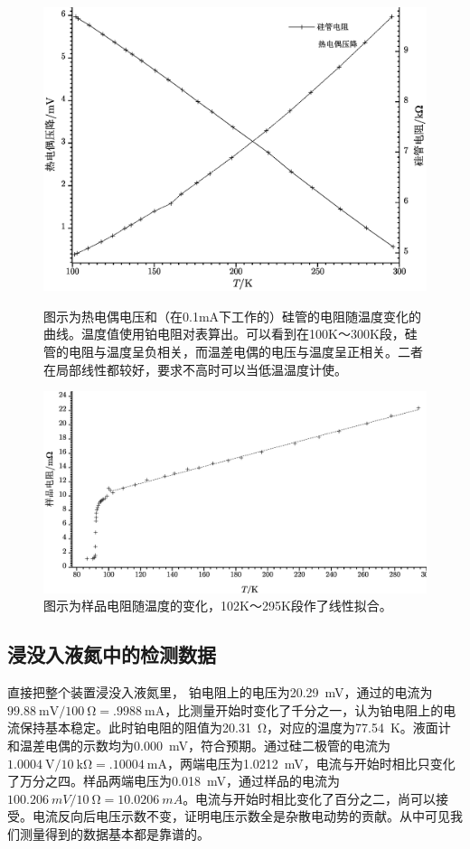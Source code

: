 \documentclass[UTF8]{ctexart}
\begin{document}
\begin{figure}
  \centering
  \includegraphics[width=0.8\linewidth]{wdj.eps}
  \caption{图示为热电偶电压和（在0.1mA下工作的）硅管的电阻随温度变化的曲线。温度值使用铂电阻对表算出。可以看到在100K～300K段，硅管的电阻与温度呈负相关，而温差电偶的电压与温度呈正相关。二者在局部线性都较好，要求不高时可以当低温温度计使。}
  
  \includegraphics[width=\linewidth]{trans.eps}
  \caption{图示为样品电阻随温度的变化，102K～295K段作了线性拟合。}
\end{figure}
\subsection{浸没入液氮中的检测数据}
直接把整个装置浸没入液氮里，
铂电阻上的电压为\SI{20.29}{\mV}，通过的电流为$\SI{99.88}{\mV}/\SI{100}{\ohm}=\SI{.9988}{\mA}$，比测量开始时变化了千分之一，认为铂电阻上的电流保持基本稳定。此时铂电阻的阻值为\SI{20.31}{\ohm}，对应的温度为\SI{77.54}{\K}。液面计和温差电偶的示数均为\SI{.000}{\mV}，符合预期。通过硅二极管的电流为$\SI{1.0004}{\V}/\SI{10}{\kilo\ohm}=\SI{.10004}{\mA}$，两端电压为\SI{1.0212}{\mV}，电流与开始时相比只变化了万分之四。样品两端电压为\SI{.018}{\mV}，通过样品的电流为$\SI{100.206}{mV}/\SI{10}{\ohm}=\SI{10.0206}{mA}$。电流与开始时相比变化了百分之二，尚可以接受。电流反向后电压示数不变，证明电压示数全是杂散电动势的贡献。从中可见我们测量得到的数据基本都是靠谱的。
\end{document}
